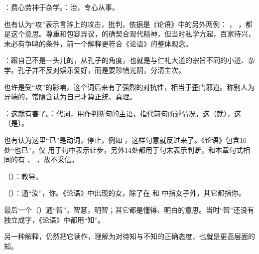 {
\item {}：费心劳神于杂学。：治，专心从事。

也有认为“攻”表示言辞上的攻击，批判，依据是《论语》中的另外两例： ， ，都是这个意思。尊重和包容异议，的确契合现代精神，但当时私学方起，百家待兴，未必有争鸣的条件，前一个解释更符合《论语》的整体观念。

：跟自己不是一头儿的，从孔子的角度，也就是与仁礼大道的宗旨不同的小道、杂学。孔子并不反对娱乐爱好，而是要珍惜光阴，分清主次。

也许是受“攻”的影响，这个词后来有了强烈的对抗性，相当于歪门邪道。称别人为异端的，常隐含认为自己才算正统、真理。

\item {}：这就有害了。：代词，用作判断句的主语，指代前句所述情况，这（就），这（是）。

也有认为这里“已”是动词，停止，例如  ，这样句意就反过来了。《论语》包含16处“也已”，仅  用于句中表示让步，另外14处都用于句末表示判断，和本章句式相同的有  、 ，故不采信。
}
{}


{
\item {}（）：教导。
\item {}（）：通“汝”，你。《论语》中出现的女，除了在  和  中指女子外，其它都指你。
\item {}最后一个（）通“智”，智慧，明智；其它都是懂得、明白的意思。当时“智”还没有独立成字，《论语》中都用“知”。

另一种解释，仍然把它读作，理解为对待知与不知的正确态度，也就是更高层面的知。
}
{}  %


